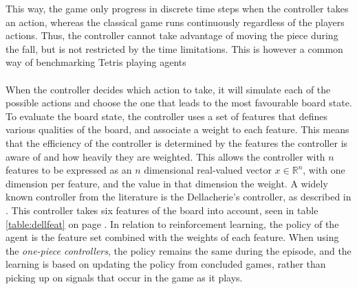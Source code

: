 This way, the game only progress in discrete time steps
when the controller takes
an action, whereas the classical game runs continuously 
regardless of the players actions.
Thus, the controller cannot take advantage of moving the piece 
during the fall, but is not restricted by the time limitations.
This is however a common way of benchmarking Tetris playing agents
\citep{scherrer2009}\\
\\
When the controller decides which action to take, it will
simulate each of the possible actions and choose the one that
leads to the most favourable board state. To evaluate the board 
state, the controller uses a set of features that defines 
various qualities of the board, and associate a weight to each 
feature. This means that the efficiency of the controller 
is determined by the features the controller is aware of
and how heavily they are weighted. This allows
the controller with $n$ features to be expressed as an 
$n$ dimensional real-valued vector $x \in \mathbb{R}^n$, with one dimension 
per feature, and the value in that dimension the weight.
A widely known controller from the literature is the Dellacherie's controller, 
as described in \cite{scherrer2009}. This controller
takes six features of the board into account, seen in table 
\ref{table:dellfeat} on page \pageref{table:dellfeat}. In relation 
to reinforcement learning, the policy of the agent is the feature set
combined with the weights of each feature. 
When using the \textit{one-piece controllers}, the policy remains 
the same during the episode, and the learning is based on updating
the policy from concluded games, rather than picking up on signals
that occur in the game as it plays.





